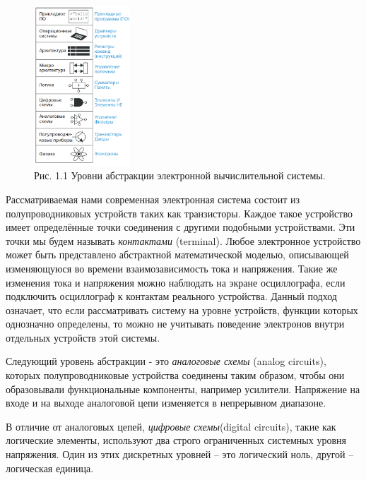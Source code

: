 	\begin{figure}[h]
		\centering
		\includegraphics[height=6cm]{img/1.1} 
		\captionsetup{font=footnotesize} 
		\caption*{Рис. 1.1 Уровни абстракции электронной вычислительной системы.} 
	\end{figure}
    
    \par Рассматриваемая нами современная электронная система состоит из полупроводниковых устройств таких как транзисторы. Каждое такое устройство имеет определённые точки соединения с другими подобными устройствами. Эти точки мы будем называть \textit{контактами} (terminal). Любое электронное устройство может быть представлено абстрактной математической моделью, описывающей изменяющуюся во времени взаимозависимость тока и напряжения. Такие же изменения тока и напряжения можно наблюдать на экране осциллографа, если подключить осциллограф к контактам реального устройства. Данный подход означает, что если рассматривать систему на уровне устройств, функции которых однозначно определены, то можно не учитывать поведение электронов внутри отдельных устройств этой системы.
    
    \par Следующий уровень абстракции - это \textit{аналоговые схемы} (analog circuits),  которых полупроводниковые
    устройства соединены таким образом, чтобы они образовывали функциональные компоненты, например усилители. Напряжение на входе и на выходе аналоговой цепи изменяется в непрерывном диапазоне. 
    
    \par В отличие от аналоговых цепей, \textit{цифровые схемы}(digital circuits), такие как логические элементы, используют два строго ограниченных системных уровня напряжения. Один из этих дискретных уровней – это логический ноль, другой – логическая единица. 
    
